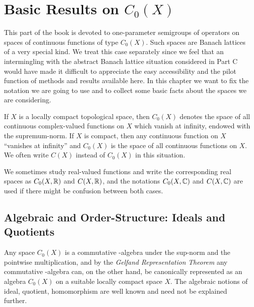 
\setcounter{chapter}{0}
\chapter{Basic Results on \texorpdfstring{$C_{0}(X)$}{C_0(X)}}\label{chap:b1}
This part of the book is devoted to one-parameter semigroups of operators on spaces of continuous functions of type $C_{0}(X)$.
Such spaces are Banach lattices of a very special kind.
We treat this case separately since we feel that an intermingling with the abstract Banach lattice situation considered in Part C would have made it difficult to appreciate the easy accessibility and the pilot function of methods and results available here.
In this chapter we want to fix the notation we are going to use and to collect some basic facts about the spaces we are considering.

If $X$ is a locally compact topological space, then $C_{0}(X)$ denotes the space of all continuous complex-valued functions on $X$ which vanish at infinity, endowed with the supremum-norm.
If $X$ is compact, then any continuous function on $X$ \enquote{vanishes at infinity} and $C_{0}(X)$ is the space of all continuous functions on $X$.
We often write $C(X)$ instead of $C_{0}(X)$ in this situation.

We sometimes study real-valued functions and write the corresponding real spaces as $C_{0}(X,\mathbb{R})$ and 
$C(X,\mathbb{R})$, and the notations $C_{0}(X,\mathbb{C})$ and $C(X,\mathbb{C})$ are used if there might be confusion between both cases.
\section{Algebraic and Order-Structure: Ideals and Quotients}\label{sec:b1-1}
Any space $C_{0}(X)$ is a commutative \CA-algebra under the sup-norm and the pointwise multiplication, and by the \emph{Gelfand Representation Theorem} any commutative \CA-algebra can, on the other hand, be canonically represented as an algebra $C_{0}(X)$ on a suitable locally compact space $X$.
The algebraic notions of ideal, quotient, homomorphism are well known and need not be explained further.

